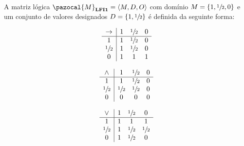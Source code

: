         \begin{definicao}\label{def:mat}
            A matriz lógica $\pazocal{M}_{\lfium{}} = \langle M, D, O \rangle$ com domínio $M = \{1, \sfrac{1}{2}{}, 0\}$ e um conjunto de valores designados $D = \{1, \sfrac{1}{2}{}\}$ é definida da seguinte forma:
            

            \vspace{\baselineskip} %

            \noindent
            \begin{minipage}{0.3\textwidth}
                \[
                    \begin{array}{c|ccc} %
                        \to & 1 & \meio{} & 0 \\
                        \hline%
                        1           & 1 & \meio{} & 0 \\
                        \meio{} & 1 & \meio{} & 0 \\
                        0           & 1 & 1           & 1 \\
                    \end{array}
                \]
            \end{minipage}
            \begin{minipage}{0.3\textwidth}
                \[
                    \begin{array}{c|ccc} %
                        \land       & 1           & \meio{} & 0 \\
                        \hline%
                        1           & 1           & \meio{} & 0 \\
                        \meio{} & \meio{} & \meio{} & 0 \\
                        0           & 0           & 0           & 0 \\
                    \end{array}
                \]
            \end{minipage}
            \begin{minipage}{0.3\textwidth}
                \[
                    \begin{array}{c|ccc} %
                        \lor        & 1 & \meio{} & 0           \\
                        \hline%
                        1           & 1 & 1           & 1           \\
                        \meio{} & 1 & \meio{} & \meio{} \\
                        0           & 1 & \meio{} & 0           \\
                    \end{array}
                \]
            \end{minipage}


\end{definicao}
